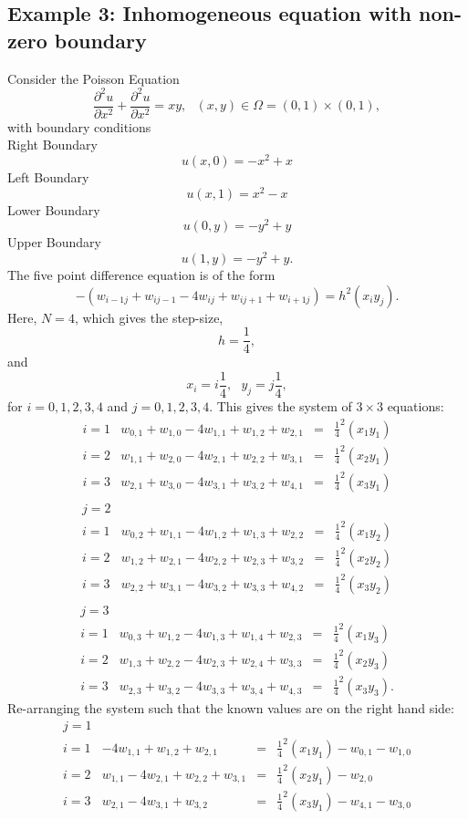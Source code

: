 \subsection{Example 3: Inhomogeneous equation with non-zero boundary}
Consider the Poisson Equation 
\[ \frac{\partial^2 u}{\partial x^2}+\frac{\partial^2 u}{\partial x^2}=xy, \ \ \ (x,y) \in \Omega=(0,1)\times (0,1), \]
with boundary conditions\\
Right Boundary
\[u(x,0) =-x^2+x \]
Left Boundary
\[u(x,1) = x^2-x  \]
Lower Boundary
\[u(0,y) = -y^2+y \]
Upper Boundary
\[u(1,y) =  -y^2+y. \]
The five point difference equation is of the form 
\[-(w_{i-1j}+w_{ij-1}-4w_{ij}+w_{ij+1}+w_{i+1j})=h^2(x_iy_j). \]
Here, $N=4$, which gives the step-size,
\[h=\frac{1}{4},\]
and
\[x_i=i\frac{1}{4}, \ \ \ y_j=j\frac{1}{4},\]
for $i=0,1,2,3,4$ and $j=0,1,2,3,4$.
This gives the system of $3\times 3$ equations:
\[\begin{array}{l|rcl}
i=1&w_{0,1}+w_{1,0}-4w_{1,1}+w_{1,2}+w_{2,1}&=&\frac{1}{4}^2(x_1y_1)\\
i=2&w_{1,1}+w_{2,0}-4w_{2,1}+w_{2,2}+w_{3,1}&=&\frac{1}{4}^2(x_2y_1)\\
i=3&w_{2,1}+w_{3,0}-4w_{3,1}+w_{3,2}+w_{4,1}&=&\frac{1}{4}^2(x_3y_1)\\
\end{array}\]	
\[\begin{array}{l|rcl}
j=2\\
i=1&w_{0,2}+w_{1,1}-4w_{1,2}+w_{1,3}+w_{2,2}&=&\frac{1}{4}^2(x_1y_2)\\
i=2&w_{1,2}+w_{2,1}-4w_{2,2}+w_{2,3}+w_{3,2}&=&\frac{1}{4}^2(x_2y_2)\\
i=3&w_{2,2}+w_{3,1}-4w_{3,2}+w_{3,3}+w_{4,2}&=&\frac{1}{4}^2(x_3y_2)\\
\end{array}\]	
\[\begin{array}{l|rcl}
j=3\\
i=1&w_{0,3}+w_{1,2}-4w_{1,3}+w_{1,4}+w_{2,3}&=&\frac{1}{4}^2(x_1y_3)\\
i=2&w_{1,3}+w_{2,2}-4w_{2,3}+w_{2,4}+w_{3,3}&=&\frac{1}{4}^2(x_2y_3)\\
i=3&w_{2,3}+w_{3,2}-4w_{3,3}+w_{3,4}+w_{4,3}&=&\frac{1}{4}^2(x_3y_3).
\end{array}
\]	
Re-arranging the system such that the known values are on the right hand side:
\[\begin{array}{l|rcl}
j=1\\
i=1&-4w_{1,1}+w_{1,2}+w_{2,1}&=&\frac{1}{4}^2(x_1y_1)-w_{0,1}-w_{1,0}\\
i=2&w_{1,1}-4w_{2,1}+w_{2,2}+w_{3,1}&=&\frac{1}{4}^2(x_2y_1)-w_{2,0}\\
i=3&w_{2,1}-4w_{3,1}+w_{3,2}&=&\frac{1}{4}^2(x_3y_1)-w_{4,1}-w_{3,0}\\
\end{array}\]	
